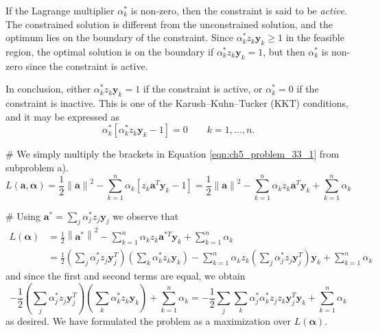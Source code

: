 \documentclass[12pt, a4paper]{article}
\newcommand{\vect}[1]{\bm{#1}}
\newcommand{\norm}[1]{\left\lVert#1\right\rVert}
\begin{document}
{\begin{easylist}[enumerate]
If the Lagrange  multiplier $\alpha_k^*$ is non-zero, then the constraint is said to be \emph{active}.
The constrained solution is different from the unconstrained solution, and the optimum lies on the boundary of the constraint.
Since $\alpha_k^* z_k \vect{y}_k \geq 1$ in the feasible region, the optimal solution is on the boundary if $\alpha_k^* z_k \vect{y}_k = 1$, but then  $\alpha_k^*$ is non-zero since the constraint is active.

In conclusion, either $\alpha_k^* z_k \vect{y}_k = 1$ if the constraint is active, or $\alpha_k^* = 0$ if the constraint is inactive.
This is one of the Karush–Kuhn–Tucker (KKT) conditions, and it may be expressed as
\begin{equation*}
	\alpha_k^* \left[ \alpha_k^* z_k \vect{y}_k - 1 \right] = 0 \qquad k = 1 , \dots, n.
\end{equation*}

# We simply multiply the brackets in Equation \eqref{eqn:ch5_problem_33_1} from subproblem a).
\begin{equation*}
L(\vect{a}, \vect{\alpha}) = \frac{1}{2} \norm{\vect{a}}^2 -
\sum_{k=1}^{n} \alpha_k \left[ z_k \vect{a}^T \vect{y}_k - 1 \right]
=
\frac{1}{2} \norm{\vect{a}}^2 -
\sum_{k=1}^{n} \alpha_k  z_k \vect{a}^T \vect{y}_k 
+
\sum_{k=1}^{n} \alpha_k 
\end{equation*}

# Using $\vect{a}^* = \sum_j \alpha_j^* z_j \vect{y}_j$ we observe that
\begin{align*}
	L(\vect{\alpha}) &= 
	\frac{1}{2} \norm{\vect{a}^*}^2 -
	\sum_{k=1}^{n} \alpha_k  z_k \vect{a}^{*T} \vect{y}_k 
	+
	\sum_{k=1}^{n} \alpha_k \\
	&= 
	\frac{1}{2} 
	\left(\sum_j \alpha_j^* z_j \vect{y}^T_j\right)
	\left(\sum_k \alpha_k^* z_k \vect{y}_k\right)
	 -
	\sum_{k=1}^{n} \alpha_k  z_k 
	\left(\sum_j \alpha_j^* z_j \vect{y}^T _j\right)
	\vect{y}_k 
	+
	\sum_{k=1}^{n} \alpha_k 
\end{align*}
and since the first and second terms are equal, we obtain
\begin{equation*}
-
\frac{1}{2} 
\left(\sum_j \alpha_j^* z_j \vect{y}^T_j\right)
\left(\sum_k \alpha_k^* z_k \vect{y}_k\right)
+
\sum_{k=1}^{n} \alpha_k 
= 
-
\frac{1}{2} 
\sum_j \sum_k \alpha_j^* \alpha_k^* z_j z_k \vect{y}_j^T \vect{y}_k
+
\sum_{k=1}^{n} \alpha_k 
\end{equation*}
as desired.
We have formulated the problem as a maximization over $L(\vect{\alpha})$.
\end{easylist}





}
\end{document}
